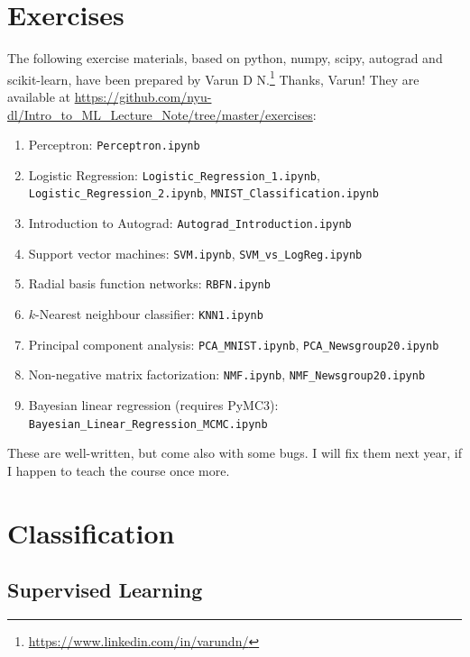 \documentclass{report}
\begin{document}
\tableofcontents

\chapter*{Exercises}

The following exercise materials, based on python, numpy, scipy, autograd and
scikit-learn, have been prepared by Varun D N.\footnote{
    \url{https://www.linkedin.com/in/varundn/}
} Thanks, Varun! 
They are available at
\url{https://github.com/nyu-dl/Intro_to_ML_Lecture_Note/tree/master/exercises}:
\begin{enumerate}
    \item Perceptron: \verb|Perceptron.ipynb|
    \item Logistic Regression: \verb|Logistic_Regression_1.ipynb|, \\
    \verb|Logistic_Regression_2.ipynb|, \verb|MNIST_Classification.ipynb|
    \item Introduction to Autograd: \verb|Autograd_Introduction.ipynb|
    \item Support vector machines: \verb|SVM.ipynb|, \verb|SVM_vs_LogReg.ipynb|
    \item Radial basis function networks: \verb|RBFN.ipynb|
    \item $k$-Nearest neighbour classifier: \verb|KNN1.ipynb|
    \item Principal component analysis: \verb|PCA_MNIST.ipynb|,
    \verb|PCA_Newsgroup20.ipynb|
    \item Non-negative matrix factorization: \verb|NMF.ipynb|,
    \verb|NMF_Newsgroup20.ipynb|
\item Bayesian linear regression (requires PyMC3): \verb|Bayesian_Linear_Regression_MCMC.ipynb|
\end{enumerate}
These are well-written, but come also with some bugs. I will fix them next year,
if I happen to teach the course once more.



\chapter{Classification}
\label{sec:classification}

\section{Supervised Learning}
\label{sec:supervised_learning}
\end{document}

